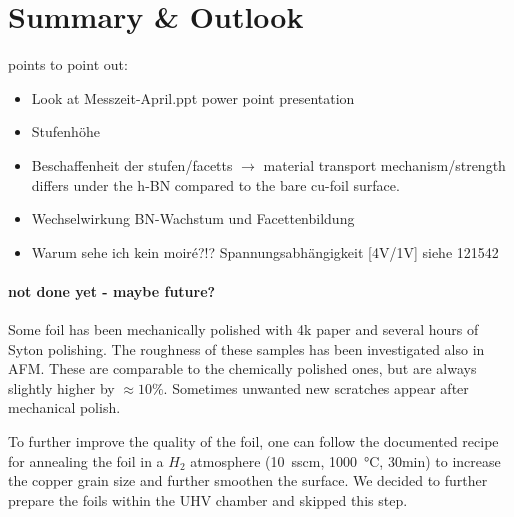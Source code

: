   
  
  \section{Summary \& Outlook}
  points to point out:
  \begin{itemize}
  	\item Look at Messzeit-April.ppt power point presentation
  	\item Stufenh\"ohe
  	\item Beschaffenheit der stufen/facetts $\rightarrow$ material transport mechanism/strength differs under the h-BN compared to the bare cu-foil surface.
  	\item Wechselwirkung BN-Wachstum und Facettenbildung
  	\item Warum sehe ich kein moir\'e?!? Spannungsabhängigkeit [4V/1V] siehe 121542
  \end{itemize}

  	\paragraph{not done yet - maybe future?}
  Some foil has been mechanically polished with 4k paper and several hours of Syton polishing. The roughness of these samples has been investigated also in AFM. These are comparable to the chemically polished ones, but are always slightly higher by $\approx 10\%$. Sometimes unwanted new scratches appear after mechanical polish.
  
  To further improve the quality of the foil, one can follow the documented recipe for annealing the foil in a $H_2$ atmosphere (\SI{10}{sscm}, \SI{1000}{\celsius}, 30min)\cite{kim_synthesis_2012} to increase the copper grain size and further smoothen the surface. We decided to further prepare the foils within the UHV chamber and skipped this step.